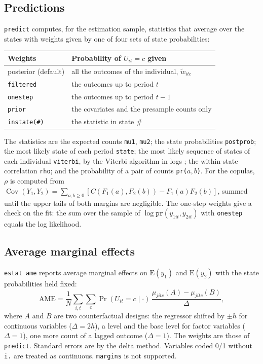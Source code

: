 \documentclass[11pt,a4paper]{article}
\newcommand{\cmd}[1]{\texttt{#1}}
\newcommand{\E}{\mathrm E}
\begin{document}
\subsection{Predictions}

\cmd{predict} computes, for the estimation sample, statistics that average over the states with
weights given by one of four sets of state probabilities:

\begin{center}
\begin{tabularx}{\textwidth}{lX}
\toprule
Weights & Probability of $U_{it}=c$ given\\
\midrule
posterior (default) & all the outcomes of the individual, $\tilde w_{itc}$\\
\cmd{filtered} & the outcomes up to period $t$\\
\cmd{onestep} & the outcomes up to period $t-1$\\
\cmd{prior} & the covariates and the presample counts only\\
\cmd{instate(\#)} & the statistic in state \# \\
\bottomrule
\end{tabularx}
\end{center}

The statistics are the expected counts \cmd{mu1}, \cmd{mu2}; the state probabilities \cmd{postprob};
the most likely state of each period \cmd{state}; the most likely sequence of states of each
individual \cmd{viterbi}, by the Viterbi algorithm in logs \citep{viterbi1967}; the within-state
correlation \cmd{rho}; and the probability of a pair of counts \cmd{pr(}$a,b$\cmd{)}. For the
copulas, $\rho$ is computed from
$\operatorname{Cov}(Y_1,Y_2)=\sum_{a,b\ge0}[C(F_1(a),F_2(b))-F_1(a)F_2(b)]$, summed until the upper
tails of both margins are negligible. The one-step weights give a check on the fit: the sum over the
sample of $\log\cmd{pr}(y_{1it},y_{2it})$ with \cmd{onestep} equals the log likelihood.

\subsection{Average marginal effects}

\cmd{estat ame} reports average marginal effects on $\E(y_1)$ and $\E(y_2)$ with the state
probabilities held fixed:
\[
\mathrm{AME}=\frac1N\sum_{i,t}\sum_{c}\Pr(U_{it}=c\mid\cdot)\,
\frac{\mu_{jitc}(A)-\mu_{jitc}(B)}{\Delta},
\]
where $A$ and $B$ are two counterfactual designs: the regressor shifted by $\pm h$ for continuous
variables ($\Delta=2h$), a level and the base level for factor variables ($\Delta=1$), one more count
of a lagged outcome ($\Delta=1$). The weights are those of \cmd{predict}. Standard errors are by the
delta method. Variables coded 0/1 without \cmd{i.} are treated as continuous. \cmd{margins} is not
supported.
\end{document}
